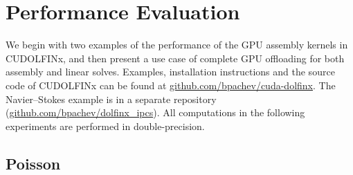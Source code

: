\section*{Performance Evaluation}

We begin with two examples of the performance of the GPU assembly kernels in CUDOLFINx, and then present a use case of complete GPU offloading for both assembly and linear solves. Examples, installation instructions and the source code of CUDOLFINx can be found at \href{https://github.com/bpachev/cuda-dolfinx}{github.com/bpachev/cuda-dolfinx}. The Navier--Stokes example is in a separate repository (\href{https://github.com/bpachev/dolfinx\_ipcs}{github.com/bpachev/dolfinx\_ipcs}). All computations in the following experiments are performed in double-precision.

\subsection*{Poisson}


